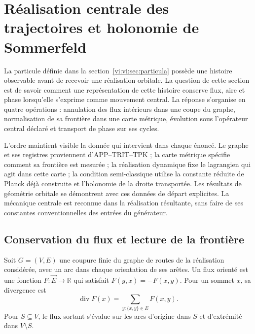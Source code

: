 \section{Réalisation centrale des trajectoires et holonomie de Sommerfeld}
\label{vi:vi:sec:kepler}

La particule définie dans la section~\ref{vi:vi:sec:particula} possède
une histoire observable avant de recevoir une réalisation orbitale.
La question de cette section est de savoir comment une représentation de cette
histoire conserve flux, aire et phase lorsqu'elle s'exprime comme
mouvement central. La réponse s'organise en quatre opérations :
annulation des flux intérieurs dans une coupe du graphe,
normalisation de sa frontière dans une carte métrique, évolution sous
l'opérateur central déclaré et transport de phase sur ses cycles.

L'ordre maintient visible la donnée qui intervient dans chaque énoncé.
Le graphe et ses registres proviennent d'APP--TRIT--TPK ; la carte
métrique spécifie comment sa frontière est mesurée ; la réalisation dynamique
fixe le lagrangien qui agit dans cette carte ; la condition semi-classique
utilise la constante réduite de Planck déjà construite et l'holonomie
de la droite transportée. Les résultats de géométrie orbitale se
démontrent avec ces données de départ explicites. La mécanique
centrale est reconnue dans la réalisation résultante, sans faire de ses
constantes conventionnelles des entrées du générateur.

\subsection{Conservation du flux et lecture de la frontière}
\label{vi:vi:subsec:gauss}

Soit $G=(V,E)$ une coupure finie du graphe de routes de la
réalisation considérée, avec un arc dans chaque orientation de ses
arêtes. Un flux orienté est une fonction
$F:\vec E\to\mathbb R$ qui satisfait
$F(y,x)=-F(x,y)$. Pour un sommet $x$, sa divergence est
\begin{equation}
 \operatorname{div}F(x)
 =\sum_{y:\{x,y\}\in E}F(x,y).
 \label{vi:vi:eq:divergencia-grafo}
\end{equation}
Pour $S\subseteq V$, le flux sortant s’évalue sur les
arcs d’origine dans $S$ et d’extrémité dans $V\setminus S$.

